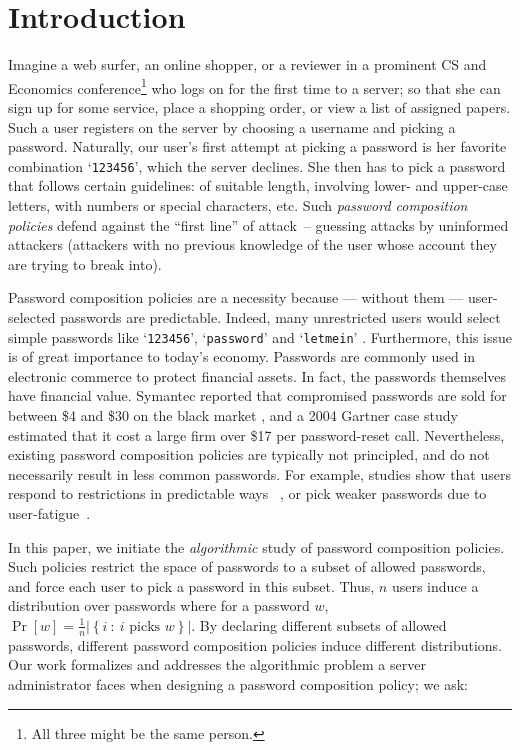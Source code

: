 \documentclass[prodmode,acmec]{ec-acmsmall}
\begin{document}
\maketitle
\section{Introduction} \label{sec:Introduction}
\def \newintro {}
\ifdefined\newintro
{
Imagine a web surfer, an online shopper, or a reviewer in a prominent CS and Economics conference\footnote{All three might be the same person.} who logs on for the first time to a server; so that she can sign up for some service,  place a shopping order, or view a list of assigned papers. Such a user registers on the server by choosing a username and picking a password. Naturally, our user's first attempt at picking a password is her favorite combination `\verb"123456"', which the server declines. She then has to pick a password that follows certain guidelines: of suitable length, involving lower- and upper-case letters, with numbers or special characters, etc. Such \emph{password composition policies} defend against the ``first line'' of attack~-- guessing attacks by uninformed attackers (attackers with no previous knowledge of the user whose account they are trying to break into). 

Password composition policies are a necessity because --- without them --- user-selected passwords are predictable. Indeed, many unrestricted users would select simple passwords like `\verb"123456"', `\verb"password"' and `\verb"letmein"' \cite{mostPopularPasswords2012}. Furthermore, this issue is of great importance to today's economy. Passwords are commonly used in electronic commerce to protect financial assets. In fact, the passwords themselves have financial value. Symantec reported that compromised passwords are sold for between \$4 and \$30 on the black market \cite{passwordBlackMarket}, and a 2004 Gartner case study \cite{costOfPasswordReset} estimated that it cost a large firm over \$17 per password-reset call. Nevertheless, existing password composition policies are typically not principled, and do not necessarily result in less common passwords. For example, studies show that users respond to restrictions in predictable ways~ \cite{komanduri2011passwords}, or pick weaker passwords due to user-fatigue~\cite{clair2006password,kruger2008empirical}.

In this paper, we initiate the \emph{algorithmic} study of password composition policies. Such policies restrict the space of passwords to a subset of allowed passwords, and force each user to pick a password in this subset. Thus, $n$ users induce a distribution over passwords where for a password $w$, $\Pr[w] = \tfrac 1 n \left|\left\{i~:~ i\textrm{ picks } w \right\}\right|$. By declaring different subsets of allowed passwords, different password composition policies induce different distributions. Our work formalizes and addresses the algorithmic problem a server administrator faces when designing a password composition policy; we ask:

}
\end{document}
